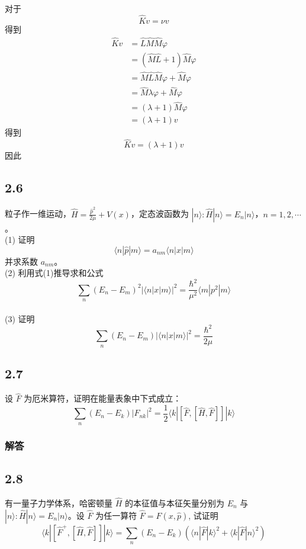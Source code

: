 对于
\begin{equation}
    \hat{K}v=\nu v
\end{equation}
得到
\begin{equation}
    \begin{aligned}
        \hat{K}v&=\hat{L}\hat{M}\hat{M}\varphi 
\\
&=\left( \hat{M}\hat{L}+1 \right) \hat{M}\varphi 
\\
&=\hat{M}\hat{L}\hat{M}\varphi +\hat{M}\varphi 
\\
&=\hat{M}\lambda \varphi +\hat{M}\varphi 
\\
&=\left( \lambda +1 \right) \hat{M}\varphi 
\\
&=\left( \lambda +1 \right) v
    \end{aligned}
\end{equation}
得到
\begin{equation}
    \hat{K}v=\left( \lambda +1 \right) v
\end{equation}
因此

\newpage
\subsection{2.6}
粒子作一维运动，$\hat{H} = \frac{\hat{p}^2}{2\mu} + V(x)$，定态波函数为 $|n\rangle : \hat{H}|n\rangle = E_n |n\rangle$，$n = 1, 2, \cdots$。
\\(1) 证明
$$\langle n | \hat{p} | m \rangle = a_{nm} \langle n | x | m \rangle $$
并求系数 $a_{nm}$。
\\(2) 利用式(1)推导求和公式
$$\sum_n (E_n - E_m)^2 | \langle n | x | m \rangle |^2 = \frac{\hbar^2}{\mu^2} \langle m | p^2 | m \rangle $$
\\(3) 证明
$$\sum_n (E_n - E_m) | \langle n | x | m \rangle |^2 = \frac{\hbar^2}{2\mu} $$

\newpage
\subsection{2.7}
设 $\hat{F}$ 为厄米算符，证明在能量表象中下式成立：
$$\sum_{n} (E_n - E_k) |F_{nk}|^2 = \frac{1}{2} \langle k| [\hat{F}, [\hat{H}, \hat{F}]] |k \rangle$$

\subsubsection{解答}

\newpage
\subsection{2.8}
有一量子力学体系，哈密顿量 $\hat{H}$ 的本征值与本征矢量分别为 $E_n$ 与 $|n\rangle: \hat{H}|n\rangle = E_n|n\rangle$。设 $\hat{F}$ 为任一算符 $\hat{F} = \hat{F}(x, \hat{p})$, 试证明
$$\langle k|[\hat{F}^+, [\hat{H}, \hat{F}]] |k \rangle = \sum_{n} (E_n - E_k) \left( \langle n|\hat{F}|k\rangle^2 + \langle k|\hat{F}|n\rangle^2 \right)$$

